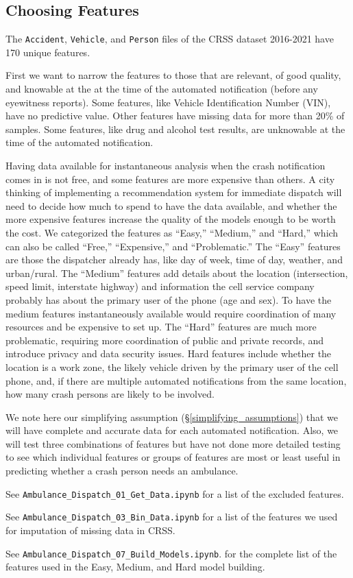 \subsection{Choosing Features}
\label{features}

The \verb|Accident|, \verb|Vehicle|, and \verb|Person| files of the CRSS dataset 2016-2021 have 170 unique features.  

First we want to narrow the features to those that are relevant, of good quality, and knowable at the at the time of the automated notification (before any eyewitness reports).  Some features, like Vehicle Identification Number (VIN), have no predictive value.  Other features have missing data for more than 20\% of samples.  Some features, like drug and alcohol test results, are unknowable at the time of the automated notification.

Having data available for instantaneous analysis when the crash notification comes in is not free, and some features are more expensive than others.  A city thinking of implementing a recommendation system for immediate dispatch will need to decide how much to spend to have the data available, and whether the more expensive features increase the quality of the models enough to be worth the cost.  We categorized the features as ``Easy,'' ``Medium,'' and ``Hard,'' which can also be called ``Free,'' ``Expensive,'' and ``Problematic.''   The ``Easy'' features are those the dispatcher already has, like day of week, time of day, weather, and urban/rural.  The ``Medium'' features add details about the location (intersection, speed limit, interstate highway) and information the cell service company probably has about the primary user of the phone (age and sex).  To have the medium features instantaneously available would require coordination of many resources and be expensive to set up.  The ``Hard'' features are much more problematic, requiring more coordination of public and private records, and introduce privacy and data security issues.  Hard features include whether the location is a work zone, the likely vehicle driven by the primary user of the cell phone, and, if there are multiple automated notifications from the same location, how many crash persons are likely to be involved.   

We note here our simplifying assumption (\S \ref{simplifying_assumptions}) that we will have complete and accurate data for each automated notification.  Also, we will test three combinations of features but have not done more detailed testing to see which individual features or groups of features are most or least useful in predicting whether a crash person needs an ambulance.  

See 
\verb|Ambulance_Dispatch_01_Get_Data.ipynb|  
for a list of the excluded features.

See \verb|Ambulance_Dispatch_03_Bin_Data.ipynb|
for a list of the features we used for imputation of missing data in CRSS.


See
\verb|Ambulance_Dispatch_07_Build_Models.ipynb|.
for the complete list of the features used in the Easy, Medium, and Hard model building.